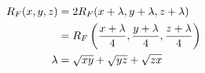 \documentclass[12pt]{article}
\begin{document}
\begin{align}
R_F(x, y, z) &= 2R_F(x+\lambda, y+\lambda, z+\lambda) \notag \\
             &= R_F\left(\frac{x+\lambda}{4}, \frac{y+\lambda}{4}, \frac{z+\lambda}{4}\right) \notag \\
\lambda &= \sqrt{xy} + \sqrt{yz} + \sqrt{zx} \notag
\end{align}
\end{document}

